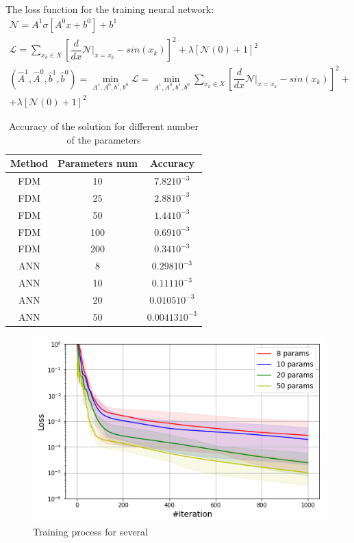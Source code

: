 The loss function for the training neural network:
\begin{equation}
	\begin{multlined}
		\mathcal{N} = A^1 \sigma \left [ A^0 x + b^0 \right ] + b^1 \\
		\mathcal{L} = \sum_{x_k \in X} \left [ \dfrac{d}{d x} \mathcal{N} \big|_{x = x_k} - sin(x_k) \right ]^2 + \lambda \left [  \mathcal{N} \left( 0 \right ) + 1 \right ]^2 \\
		\left ( \hat{A}^1, \hat{A}^0, \hat{b}^1, \hat{b}^0 \right ) = \min_{A^1, A^0, b^1, b^0} \mathcal{L} = \min_{A^1, A^0, b^1, b^0} \sum_{x_k \in X} \left [ \dfrac{d}{d x} \mathcal{N} \big|_{x = x_k} - sin(x_k) \right ]^2 + \\ + \lambda \left [  \mathcal{N} \left( 0 \right ) + 1 \right ]^2
	\end{multlined}
\end{equation}

\begin{table}
	\centering
	\begin{tabular}{| c | c | c |} 
	\hline
		Method & Parameters num & Accuracy \\
		\hline FDM & 10  & $7.82 10^{-3}$  \\ 
		FDM & 25  & $2.88 10^{-3}$  \\
		FDM & 50  & $1.44 10^{-3}$  \\
		FDM & 100  & $0.69 10^{-3}$ \\
		FDM & 200  & $0.34 10^{-3}$ \\
		ANN & 8  & $0.298 10^{-3}$  \\
		ANN & 10  & $0.111 10^{-3}$ \\
		ANN & 20  & $0.0105 10^{-3}$  \\
		ANN & 50  & $0.00413 10^{-3}$ \\ \hline
	\end{tabular}
	\caption{Accuracy of the solution for different number of the parameters}
	\label{table:ode1_tab}
\end{table}

\begin{figure}
	\centering
	\includegraphics[width=\textwidth]{images/chapter2/ode1-training-info.png}
	\caption{Training process for several}
	\label{fig:ode1}
\end{figure}

